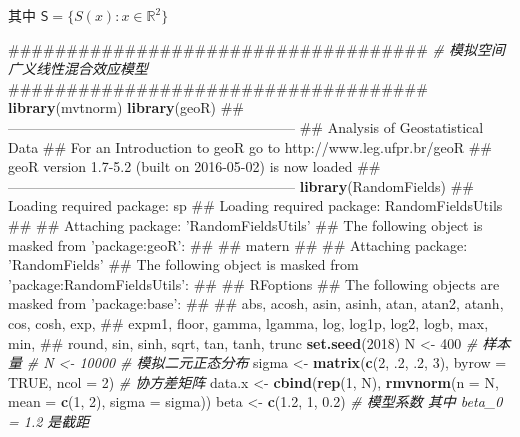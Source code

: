 \documentclass[]{article}
\newenvironment{Shaded}{\begin{snugshade}}{\end{snugshade}}
\newcommand{\KeywordTok}[1]{\textcolor[rgb]{0.13,0.29,0.53}{\textbf{#1}}}
\newcommand{\DataTypeTok}[1]{\textcolor[rgb]{0.13,0.29,0.53}{#1}}
\newcommand{\DecValTok}[1]{\textcolor[rgb]{0.00,0.00,0.81}{#1}}
\newcommand{\FloatTok}[1]{\textcolor[rgb]{0.00,0.00,0.81}{#1}}
\newcommand{\StringTok}[1]{\textcolor[rgb]{0.31,0.60,0.02}{#1}}
\newcommand{\CommentTok}[1]{\textcolor[rgb]{0.56,0.35,0.01}{\textit{#1}}}
\newcommand{\OtherTok}[1]{\textcolor[rgb]{0.56,0.35,0.01}{#1}}
\newcommand{\NormalTok}[1]{#1}
\begin{document}
其中 \(\mathsf{S} = \{S(x):x \in \mathbb{R}^2\}\)

\begin{Shaded}
\begin{Highlighting}[]
\NormalTok{####################################}
\CommentTok{# 模拟空间广义线性混合效应模型}
\NormalTok{####################################}
\KeywordTok{library}\NormalTok{(mvtnorm)}
\KeywordTok{library}\NormalTok{(geoR) }
\NormalTok{## --------------------------------------------------------------}
\NormalTok{##  Analysis of Geostatistical Data}
\NormalTok{##  For an Introduction to geoR go to http://www.leg.ufpr.br/geoR}
\NormalTok{##  geoR version 1.7-5.2 (built on 2016-05-02) is now loaded}
\NormalTok{## --------------------------------------------------------------}
\KeywordTok{library}\NormalTok{(RandomFields)}
\NormalTok{## Loading required package: sp}
\NormalTok{## Loading required package: RandomFieldsUtils}
\NormalTok{## }
\NormalTok{## Attaching package: 'RandomFieldsUtils'}
\NormalTok{## The following object is masked from 'package:geoR':}
\NormalTok{## }
\NormalTok{##     matern}
\NormalTok{## }
\NormalTok{## Attaching package: 'RandomFields'}
\NormalTok{## The following object is masked from 'package:RandomFieldsUtils':}
\NormalTok{## }
\NormalTok{##     RFoptions}
\NormalTok{## The following objects are masked from 'package:base':}
\NormalTok{## }
\NormalTok{##     abs, acosh, asin, asinh, atan, atan2, atanh, cos, cosh, exp,}
\NormalTok{##     expm1, floor, gamma, lgamma, log, log1p, log2, logb, max, min,}
\NormalTok{##     round, sin, sinh, sqrt, tan, tanh, trunc}
\KeywordTok{set.seed}\NormalTok{(}\DecValTok{2018}\NormalTok{)}
\NormalTok{N <-}\StringTok{ }\DecValTok{400} \CommentTok{# 样本量}
\CommentTok{# N <- 10000 }
\CommentTok{# 模拟二元正态分布}
\NormalTok{sigma <-}\StringTok{ }\KeywordTok{matrix}\NormalTok{(}\KeywordTok{c}\NormalTok{(}\DecValTok{2}\NormalTok{, .}\DecValTok{2}\NormalTok{, .}\DecValTok{2}\NormalTok{, }\DecValTok{3}\NormalTok{), }\DataTypeTok{byrow =} \OtherTok{TRUE}\NormalTok{, }\DataTypeTok{ncol =} \DecValTok{2}\NormalTok{) }\CommentTok{# 协方差矩阵  }
\NormalTok{data.x <-}\StringTok{ }\KeywordTok{cbind}\NormalTok{(}\KeywordTok{rep}\NormalTok{(}\DecValTok{1}\NormalTok{, N), }\KeywordTok{rmvnorm}\NormalTok{(}\DataTypeTok{n =}\NormalTok{ N, }\DataTypeTok{mean =} \KeywordTok{c}\NormalTok{(}\DecValTok{1}\NormalTok{, }\DecValTok{2}\NormalTok{), }\DataTypeTok{sigma =}\NormalTok{ sigma))}
\NormalTok{beta <-}\StringTok{ }\KeywordTok{c}\NormalTok{(}\FloatTok{1.2}\NormalTok{, }\DecValTok{1}\NormalTok{, }\FloatTok{0.2}\NormalTok{) }\CommentTok{# 模型系数 其中 beta_0 = 1.2 是截距  }

\end{Highlighting}
\end{Shaded}
\end{document}
